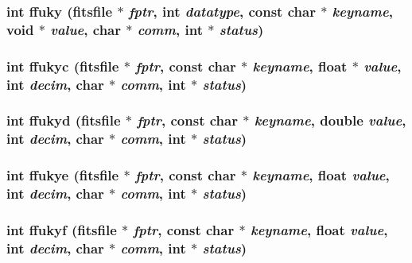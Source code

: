 \subsubsection{\setlength{\rightskip}{0pt plus 5cm}int ffuky (\bf{fitsfile} $\ast$ {\em fptr}, int {\em datatype}, const char $\ast$ {\em keyname}, void $\ast$ {\em value}, char $\ast$ {\em comm}, int $\ast$ {\em status})}\label{test_2shm__client_2fitsio_8h_a402f603cec33c59a9b6dec08dc7d35e}


\subsubsection{\setlength{\rightskip}{0pt plus 5cm}int ffukyc (\bf{fitsfile} $\ast$ {\em fptr}, const char $\ast$ {\em keyname}, float $\ast$ {\em value}, int {\em decim}, char $\ast$ {\em comm}, int $\ast$ {\em status})}\label{test_2shm__client_2fitsio_8h_ded0f88f0f2938fd23a49b55afd453c4}


\subsubsection{\setlength{\rightskip}{0pt plus 5cm}int ffukyd (\bf{fitsfile} $\ast$ {\em fptr}, const char $\ast$ {\em keyname}, double {\em value}, int {\em decim}, char $\ast$ {\em comm}, int $\ast$ {\em status})}\label{test_2shm__client_2fitsio_8h_07915bf0e4579bc324d213671d1d6f32}


\subsubsection{\setlength{\rightskip}{0pt plus 5cm}int ffukye (\bf{fitsfile} $\ast$ {\em fptr}, const char $\ast$ {\em keyname}, float {\em value}, int {\em decim}, char $\ast$ {\em comm}, int $\ast$ {\em status})}\label{test_2shm__client_2fitsio_8h_7d74546a4ae0316680f0d5b12899f2a5}


\subsubsection{\setlength{\rightskip}{0pt plus 5cm}int ffukyf (\bf{fitsfile} $\ast$ {\em fptr}, const char $\ast$ {\em keyname}, float {\em value}, int {\em decim}, char $\ast$ {\em comm}, int $\ast$ {\em status})}\label{test_2shm__client_2fitsio_8h_7e2a06ea877d0f925b262790562ddfee}


